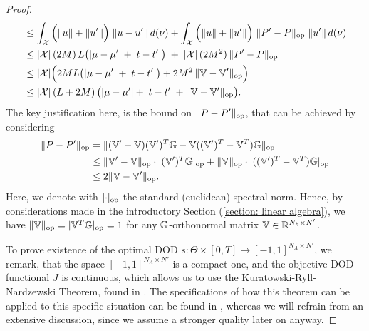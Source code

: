 \begin{proof}
\begin{align*}
        &\leq \int_{\mathcal{X}}
           \Big( \lVert u \rVert + \lVert u' \rVert \Big)\;
           \lVert u - u' \rVert \, d(\nu)
           + \int_{\mathcal{X}}
           \Big( \lVert u \rVert + \lVert u' \rVert \Big)\;
           \lVert P' - P \rVert_\text{op} \; \lVert u' \rVert \, d(\nu)
           \\
        &\leq |\mathcal{X}| \, (2M)\, L \big(\lvert \mu-\mu' \rvert + \lvert t-t' \rvert\big)
           \;+\; |\mathcal{X}| \, (2M^2)\, \lVert P' - P \rVert_\text{op}
           \\
        &\leq |\mathcal{X}| \Big( 2ML \big(\lvert \mu-\mu' \rvert + \lvert t-t' \rvert\big) + 2 M^2 \, \lVert \mathbb{V} - \mathbb{V}' \rVert_\text{op} \Big) \\
        &\leq |\mathcal{X}| \, (L + 2M)\, \big(\lvert \mu-\mu' \rvert + \lvert t-t' \rvert + \lVert \mathbb{V} - \mathbb{V}' \rVert_\text{op}\big).
    \end{align*}
    The key justification here, is the bound on $\lVert P - P' \rVert_\text{op}$, that can be achieved by considering 
    \begin{align*}
        \lVert P - P' \rVert_\text{op} &= \lVert (\mathbb{V}' - \mathbb{V}) (\mathbb{V}')^T \mathbb{G} - \mathbb{V} ((\mathbb{V}')^T - \mathbb{V}^T) \mathbb{G} \rVert_\text{op} \\
        &\leq \lVert \mathbb{V}' - \mathbb{V} \rVert_\text{op} \cdot \lvert (\mathbb{V}')^T \mathbb{G} \rvert_\text{op} + \lVert \mathbb{V} \rVert_\text{op} \cdot \lvert ((\mathbb{V}')^T - \mathbb{V}^T) \mathbb{G} \rvert_\text{op} \\
        &\leq 2 \lVert \mathbb{V} - \mathbb{V}' \rVert_\text{op}.
    \end{align*}
    Here, we denote with $\lvert \cdot \rvert_\text{op}$ the standard (euclidean) spectral norm. Hence, by considerations
    made in the introductory Section (\ref{section: linear algebra}), we have $\lVert \mathbb{V} \rVert_\text{op} = \lvert \mathbb{V}^T \mathbb{G} \rvert_\text{op} = 1$ for
    any $\mathbb{G}$-orthonormal matrix $\mathbb{V} \in \mathbb{R}^{N_h \times N'}$.
    
    To prove existence of the optimal DOD $s: \Theta \times [0, T]
    \to [-1, 1]^{N_A \times N'}$, we remark, that the space $[-1, 1]^{N_A \times N'}$ is a compact one,
    and the objective DOD functional $J$ is continuous, which allows us to use 
    the Kuratowski-Ryll-Nardzewski Theorem, found in \cite{kuratowski1965}. The specifications of
    how this theorem can be applied to this specific situation can be found in \cite[Appendix B.]{franco2024},
    whereas we will refrain from an extensive discussion, since we assume a stronger quality later on anyway.
\end{proof}



 

